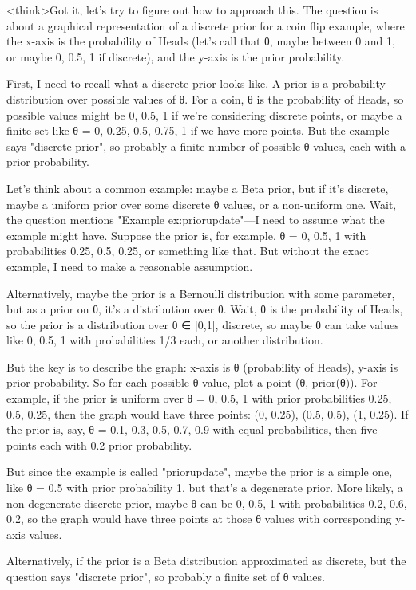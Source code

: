 <think>Got it, let's try to figure out how to approach this. The question is about a graphical representation of a discrete prior for a coin flip example, where the x-axis is the probability of Heads (let's call that θ, maybe between 0 and 1, or maybe 0, 0.5, 1 if discrete), and the y-axis is the prior probability. 

First, I need to recall what a discrete prior looks like. A prior is a probability distribution over possible values of θ. For a coin, θ is the probability of Heads, so possible values might be 0, 0.5, 1 if we're considering discrete points, or maybe a finite set like θ = 0, 0.25, 0.5, 0.75, 1 if we have more points. But the example says "discrete prior", so probably a finite number of possible θ values, each with a prior probability.

Let's think about a common example: maybe a Beta prior, but if it's discrete, maybe a uniform prior over some discrete θ values, or a non-uniform one. Wait, the question mentions "Example ex:priorupdate"—I need to assume what the example might have. Suppose the prior is, for example, θ = 0, 0.5, 1 with probabilities 0.25, 0.5, 0.25, or something like that. But without the exact example, I need to make a reasonable assumption.

Alternatively, maybe the prior is a Bernoulli distribution with some parameter, but as a prior on θ, it's a distribution over θ. Wait, θ is the probability of Heads, so the prior is a distribution over θ ∈ [0,1], discrete, so maybe θ can take values like 0, 0.5, 1 with probabilities 1/3 each, or another distribution.

But the key is to describe the graph: x-axis is θ (probability of Heads), y-axis is prior probability. So for each possible θ value, plot a point (θ, prior(θ)). For example, if the prior is uniform over θ = 0, 0.5, 1 with prior probabilities 0.25, 0.5, 0.25, then the graph would have three points: (0, 0.25), (0.5, 0.5), (1, 0.25). If the prior is, say, θ = 0.1, 0.3, 0.5, 0.7, 0.9 with equal probabilities, then five points each with 0.2 prior probability.

But since the example is called "priorupdate", maybe the prior is a simple one, like θ = 0.5 with prior probability 1, but that's a degenerate prior. More likely, a non-degenerate discrete prior, maybe θ can be 0, 0.5, 1 with probabilities 0.2, 0.6, 0.2, so the graph would have three points at those θ values with corresponding y-axis values.

Alternatively, if the prior is a Beta distribution approximated as discrete, but the question says "discrete prior", so probably a finite set of θ values.

